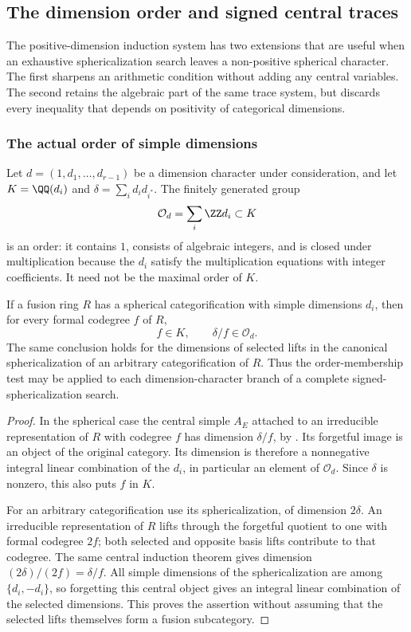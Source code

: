 \subsection{The dimension order and signed central traces}\label{sec:dimension-order}
The positive-dimension induction system has two extensions that are useful
when an exhaustive sphericalization search leaves a non-positive
spherical character. The first sharpens an arithmetic condition without
adding any central variables. The second retains the algebraic part of
the same trace system, but discards every inequality that depends on
positivity of categorical dimensions.

\subsubsection{The actual order of simple dimensions}
Let $d=(1,d_1,\ldots,d_{r-1})$ be a dimension character under
consideration, and let $K=\QQ(d_i)$ and $\delta=\sum_i d_i d_{i^*}$.
The finitely generated group
\[
 \mathcal O_d=\sum_i\ZZ d_i\subset K
\]
is an order: it contains $1$, consists of algebraic integers, and is
closed under multiplication because the $d_i$ satisfy the multiplication
equations with integer coefficients. It need not be the maximal order
of $K$.

\begin{proposition}\label{prop:dimension-order}
If a fusion ring $R$ has a spherical categorification with simple
dimensions $d_i$, then for every formal codegree $f$ of $R$,
\begin{equation}\label{eq:dimension-order}
 f\in K,\qquad \delta/f\in\mathcal O_d.
\end{equation}
The same conclusion holds for the dimensions of selected lifts in the
canonical sphericalization of an arbitrary categorification of $R$.
Thus the order-membership test may be applied to each dimension-character
branch of a complete signed-sphericalization search.
\end{proposition}
\begin{proof}
In the spherical case the central simple $A_E$ attached to an irreducible
representation of $R$ with codegree $f$ has dimension $\delta/f$, by
\cite[Theorem~2.13]{Ostrik3}. Its forgetful image is an object of the
original category. Its dimension is therefore a nonnegative integral
linear combination of the $d_i$, in particular an element of
$\mathcal O_d$. Since $\delta$ is nonzero, this also puts $f$ in $K$.

For an arbitrary categorification use its sphericalization, of dimension
$2\delta$. An irreducible representation of $R$ lifts through the
forgetful quotient to one with formal codegree $2f$; both selected and
opposite basis lifts contribute to that codegree. The same central
induction theorem gives dimension $(2\delta)/(2f)=\delta/f$.
All simple dimensions of the sphericalization are among $\{d_i,-d_i\}$,
so forgetting this central object gives an integral linear combination
of the selected dimensions. This proves the assertion without assuming
that the selected lifts themselves form a fusion subcategory.
\end{proof}

